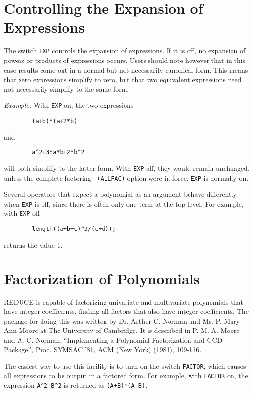 \documentclass[11pt,letterpaper]{book}
\makeatletter
\newcommand{\REDUCE}{REDUCE}
\newcommand{\underscore}{\_}
\newcommand{\ttindex}[1]{{\renewcommand{\_}{\protect\underscore}%
                          \index{#1@{\tt #1}}}}
\makeatother
\begin{document}
\section{Controlling the Expansion of Expressions}

The switch {\tt EXP}\ttindex{EXP} controls the expansion of expressions.  If
it is off, no expansion of powers or products of expressions occurs.
Users should note however that in this case results come out in a normal
but not necessarily canonical form.  This means that zero expressions
simplify to zero, but that two equivalent expressions need not necessarily
simplify to the same form.

{\it Example:} With {\tt EXP} on, the two expressions
{\small\begin{verbatim}
        (a+b)*(a+2*b)
\end{verbatim}}
and
{\small\begin{verbatim}
        a^2+3*a*b+2*b^2
\end{verbatim}}
will both simplify to the latter form.  With {\tt EXP}
off, they would remain unchanged, unless the complete factoring {\tt
(ALLFAC)} option were in force. {\tt EXP} is normally on.

Several operators that expect a polynomial as an argument behave
differently when {\tt EXP} is off, since there is often only one term at
the top level.  For example, with {\tt EXP} off
{\small\begin{verbatim}
        length((a+b+c)^3/(c+d));
\end{verbatim}}
returns the value 1.

\section{Factorization of Polynomials}
{\REDUCE} is capable of factorizing univariate and multivariate polynomials
that have integer coefficients, finding all factors that also have integer
coefficients. The package for doing this was written by Dr. Arthur C.
Norman and Ms. P. Mary Ann Moore at The University of Cambridge. It is
described in P. M. A. Moore and A. C. Norman, ``Implementing a Polynomial
Factorization and GCD Package'', Proc. SYMSAC '81, ACM (New York) (1981),
109-116.

The easiest way to use this facility is to turn on the switch
{\tt FACTOR},\ttindex{FACTOR} which causes all expressions to be output in
a factored form.  For example, with {\tt FACTOR} on, the expression
{\tt A\verb|^|2-B\verb|^|2} is returned as {\tt (A+B)*(A-B)}.
\end{document}
